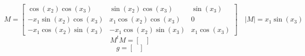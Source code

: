 \[
M = \begin{bmatrix}
\cos(x_2)\cos(x_3) & \sin(x_2)\cos(x_3) & \sin(x_3) \\
-x_1\sin(x_2)\cos(x_3) & x_1\cos(x_2)\cos(x_3) & 0 \\
-x_1 \cos(x_2)\sin(x_3) & -x_1 \cos(x_2)\sin(x_3) & x_1\cos(x_3)
\end{bmatrix} \quad |M| = x_1 \sin(x_3)
\]
\[
M^tM =
\begin{bmatrix}

\end{bmatrix}
\]
\[
g =
\begin{bmatrix}

\end{bmatrix}
\]